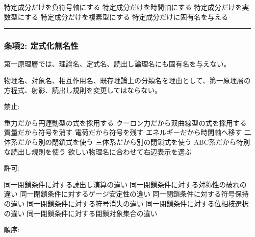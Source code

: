 \documentclass[
  a4paper,
]{ltjsarticle}
\newenvironment{Shaded}{}{}
\newcommand{\NormalTok}[1]{#1}
\begin{document}
\begin{Shaded}
\begin{Highlighting}[]
\NormalTok{特定成分だけを負符号軸にする}
\NormalTok{特定成分だけを時間軸にする}
\NormalTok{特定成分だけを実数型にする}
\NormalTok{特定成分だけを複素型にする}
\NormalTok{特定成分だけに固有名を与える}
\end{Highlighting}
\end{Shaded}

\begin{center}\rule{0.5\linewidth}{0.5pt}\end{center}

\subsubsection{条項2:
定式化無名性}\label{ux6761ux98052-ux5b9aux5f0fux5316ux7121ux540dux6027}

第一原理層では、理論名、定式名、読出し論理名にも固有名を与えない。

物理名、対象名、相互作用名、既存理論上の分類名を理由として、第一原理層の方程式、射影、読出し規則を変更してはならない。

禁止:

\begin{Shaded}
\begin{Highlighting}[]
\NormalTok{重力だから円運動型の式を採用する}
\NormalTok{クーロン力だから双曲線型の式を採用する}
\NormalTok{質量だから符号を消す}
\NormalTok{電荷だから符号を残す}
\NormalTok{エネルギーだから時間軸へ移す}
\NormalTok{二体系だから別の閉鎖式を使う}
\NormalTok{三体系だから別の閉鎖式を使う}
\NormalTok{ABC系だから特別な読出し規則を使う}
\NormalTok{欲しい物理名に合わせて右辺表示を選ぶ}
\end{Highlighting}
\end{Shaded}

許可:

\begin{Shaded}
\begin{Highlighting}[]
\NormalTok{同一閉鎖条件に対する読出し演算の違い}
\NormalTok{同一閉鎖条件に対する対称性の破れの違い}
\NormalTok{同一閉鎖条件に対するゲージ安定性の違い}
\NormalTok{同一閉鎖条件に対する符号保持の違い}
\NormalTok{同一閉鎖条件に対する符号消失の違い}
\NormalTok{同一閉鎖条件に対する位相枝選択の違い}
\NormalTok{同一閉鎖条件に対する閉鎖対象集合の違い}
\end{Highlighting}
\end{Shaded}

順序:
\end{document}
